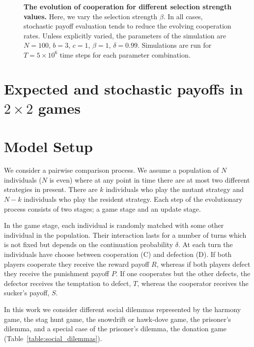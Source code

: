 \documentclass[11pt]{article}
\theoremstyle{plainCl1}
\theoremstyle{plainCl2}
\begin{document}
\begin{figure}[!htbp]
\begin{subfigure}{.5\textwidth}
  \end{subfigure}
\caption{{\bf The evolution of cooperation for different selection strength values.} 
Here, we vary the selection strength $\beta$. In all cases, stochastic payoff
evaluation tends to reduce the evolving cooperation rates. Unless explicitly
varied, the parameters of the simulation are $N\!=\!100$, $b\!=\!3$, $c\!=\!1$,
$\beta\!=\!1$, $\delta\!=\!0.99$. Simulations are run for $T\!=\!5\times 10^6$
time steps for each parameter
combination.}\label{fig:cooperation_rate_over_betas}
\end{figure}

\section{Expected and stochastic payoffs in $2 \times 2$ games}\label{section:2_by_2_games}

\appendix

\section{Model Setup}\label{appendix:methods}

We consider a pairwise comparison process. We assume a population of \(N\)
individuals (\(N\) is even) where at any point in time there are at most two
different strategies in present. There are \(k\) individuals who play the mutant
strategy and \(N - k\) individuals who play the resident strategy. Each step of
the evolutionary process consists of two stages; a game stage and an update
stage.

In the game stage, each individual is randomly matched with some other
individual in the population. Their interaction lasts for a number of turns
which is not fixed but depends on the continuation probability \(\delta\). At
each turn the individuals have choose between cooperation (C) and defection (D).
If both players cooperate they receive the reward payoff \(R\), whereas if both
players defect they receive the punishment payoff \(P\). If one cooperates but
the other defects, the defector receives the temptation to defect, \(T\),
whereas the cooperator receives the sucker's payoff, \(S\).

In this work we consider different social dilemmas represented by the harmony
game, the stag hunt game, the snowdrift or hawk-dove game, the prisoner's
dilemma, and a special case of the prisoner's dilemma, the donation game
(Table~\ref{table:social_dilemmas}).
\end{document}

